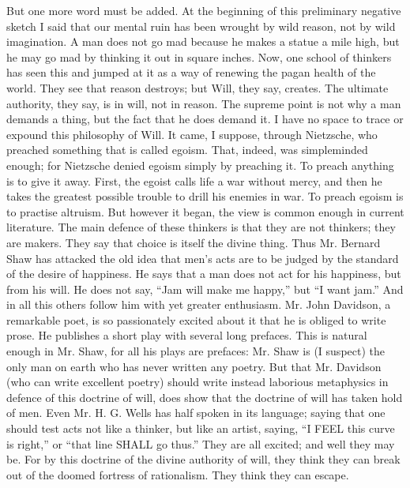 But one more word must be added. At the beginning of this preliminary negative sketch I said that our mental ruin has been wrought by wild reason, not by wild imagination. A man does not go mad because he makes a statue a mile high, but he may go mad by thinking it out in square inches. Now, one school of thinkers has seen this and jumped at it as a way of renewing the pagan health of the world. They see that reason destroys; but Will, they say, creates. The ultimate authority, they say, is in will, not in reason. The supreme point is not why a man demands a thing, but the fact that he does demand it. I have no space to trace or expound this philosophy of Will. It came, I suppose, through Nietzsche, who preached something that is called egoism. That, indeed, was simpleminded enough; for Nietzsche denied egoism simply by preaching it. To preach anything is to give it away. First, the egoist calls life a war without mercy, and then he takes the greatest possible trouble to drill his enemies in war. To preach egoism is to practise altruism. But however it began, the view is common enough in current literature. The main defence of these thinkers is that they are not thinkers; they are makers. They say that choice is itself the divine thing. Thus Mr. Bernard Shaw has attacked the old idea that men’s acts are to be judged by the standard of the desire of happiness. He says that a man does not act for his happiness, but from his will. He does not say, “Jam will make me happy,” but “I want jam.” And in all this others follow him with yet greater enthusiasm. Mr. John Davidson, a remarkable poet, is so passionately excited about it that he is obliged to write prose. He publishes a short play with several long prefaces. This is natural enough in Mr. Shaw, for all his plays are prefaces: Mr. Shaw is (I suspect) the only man on earth who has never written any poetry. But that Mr. Davidson (who can write excellent poetry) should write instead laborious metaphysics in defence of this doctrine of will, does show that the doctrine of will has taken hold of men. Even Mr. H. G. Wells has half spoken in its language; saying that one should test acts not like a thinker, but like an artist, saying, “I FEEL this curve is right,” or “that line SHALL go thus.” They are all excited; and well they may be. For by this doctrine of the divine authority of will, they think they can break out of the doomed fortress of rationalism. They think they can escape.

